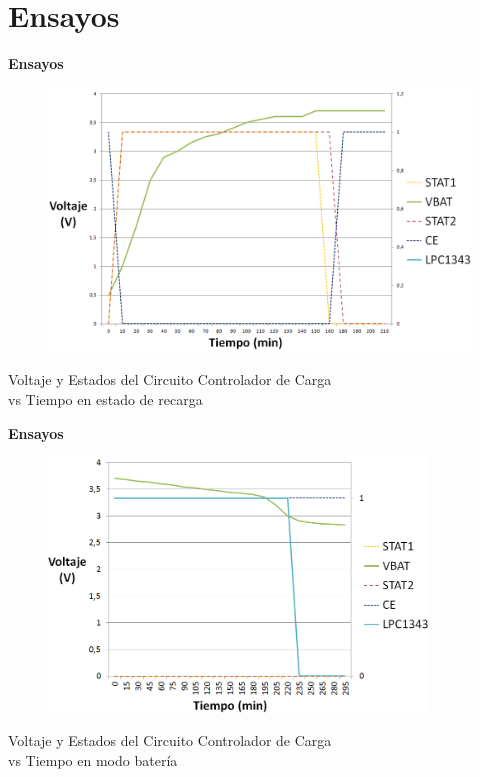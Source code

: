 \documentclass[aspectratio=43, handout]{beamer}
\begin{document}
\section{Ensayos}
\begin{frame}{\textbf{\LARGE{Ensayos}}}
\begin{center}
		\begin{figure}[H]
			{\includegraphics[width=1\textwidth]{./imagenes/cargas.png}}
		\end{figure}	
		\vspace{5px} 
		Voltaje y Estados del Circuito Controlador de Carga\\
		vs Tiempo en estado de recarga
\end{center}	  	
\end{frame}

\begin{frame}{\textbf{\LARGE{Ensayos}}}
\begin{center}
		\begin{figure}[H]
			{\includegraphics[width=0.9\textwidth]{./imagenes/descargas.PNG}}
		\end{figure}	 
		\vspace{10px} 
		Voltaje y Estados del Circuito Controlador de Carga\\
		vs Tiempo en modo batería
\end{center}	 	  	
\end{frame}
\end{document}
